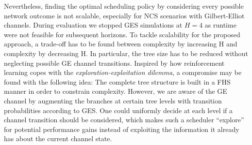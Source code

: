 Nevertheless, finding the optimal scheduling policy by considering every
possible network outcome is not scalable, especially for NCS scenarios with
Gilbert-Elliot channels. During evaluation we stopped GES simulations at $H=4$
as runtime were not feasible for subsequent horizons. To tackle scalability for
the proposed approach, a trade-off has to be found between complexity by
increasing H and complexity by decreasing H. In particular, the tree size has to
be reduced without neglecting possible GE channel transitions. Inspired by how
reinforcement learning copes with the \textit{exploration-exploitation dilemma},
a compromise may be found with the following idea: The complete tree structure
is built in a FHS manner in order to constrain complexity. However, we are aware
of the GE channel by augmenting the branches at certain tree levels with
transition probabilities according to GES. One could uniformly decide at each
level if a channel transition should be considered, which makes such a scheduler
``explore'' for potential performance gains instead of exploiting the
information it already has about the current channel state.
